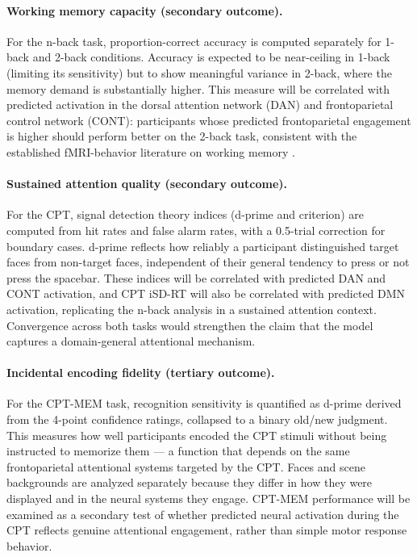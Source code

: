 \paragraph{Working memory capacity (secondary outcome).} For the n-back task, proportion-correct accuracy is computed separately for 1-back and 2-back conditions. Accuracy is expected to be near-ceiling in 1-back (limiting its sensitivity) but to show meaningful variance in 2-back, where the memory demand is substantially higher. This measure will be correlated with predicted activation in the dorsal attention network (DAN) and frontoparietal control network (CONT): participants whose predicted frontoparietal engagement is higher should perform better on the 2-back task, consistent with the established fMRI-behavior literature on working memory \citep{braun2015, cole2013}.

\paragraph{Sustained attention quality (secondary outcome).} For the CPT, signal detection theory indices (d-prime and criterion) are computed from hit rates and false alarm rates, with a 0.5-trial correction for boundary cases. d-prime reflects how reliably a participant distinguished target faces from non-target faces, independent of their general tendency to press or not press the spacebar. These indices will be correlated with predicted DAN and CONT activation, and CPT iSD-RT will also be correlated with predicted DMN activation, replicating the n-back analysis in a sustained attention context. Convergence across both tasks would strengthen the claim that the model captures a domain-general attentional mechanism.

\paragraph{Incidental encoding fidelity (tertiary outcome).} For the CPT-MEM task, recognition sensitivity is quantified as d-prime derived from the 4-point confidence ratings, collapsed to a binary old/new judgment. This measures how well participants encoded the CPT stimuli without being instructed to memorize them --- a function that depends on the same frontoparietal attentional systems targeted by the CPT. Faces and scene backgrounds are analyzed separately because they differ in how they were displayed and in the neural systems they engage. CPT-MEM performance will be examined as a secondary test of whether predicted neural activation during the CPT reflects genuine attentional engagement, rather than simple motor response behavior.

